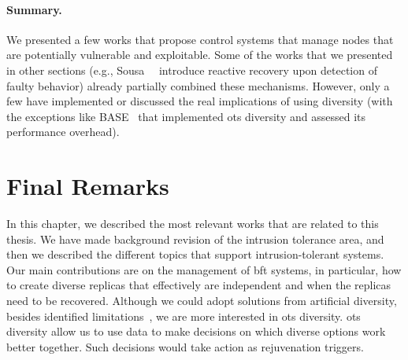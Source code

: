 \paragraph{Summary.}
We presented a few works that propose control systems that manage nodes that are potentially vulnerable and exploitable.
Some of the works that we presented in other sections (e.g., Sousa~\etal{}~\cite{Sousa:2010} introduce reactive recovery upon detection of faulty behavior) already partially combined these mechanisms. 
However, only a few have implemented or discussed the real implications of using diversity (with the exceptions like BASE~\cite{Castro:2003} that implemented \gls{ots} diversity and assessed its performance overhead).


\section{Final Remarks}
In this chapter, we described the most relevant works that are related to this thesis.
We have made background revision of the intrusion tolerance area, and then we described the different topics that support intrusion-tolerant systems.
Our main contributions are on the management of \gls{bft} systems, in particular, how to create diverse replicas that effectively are independent and when the replicas need to be recovered. 
Although we could adopt solutions from artificial diversity, besides identified limitations~\cite{Snow:2013,Bittau:2014}, we are more interested in \gls{ots} diversity.
\gls{ots} diversity allow us to use data to make decisions on which diverse options work better together.
Such decisions would take action as rejuvenation triggers. 




